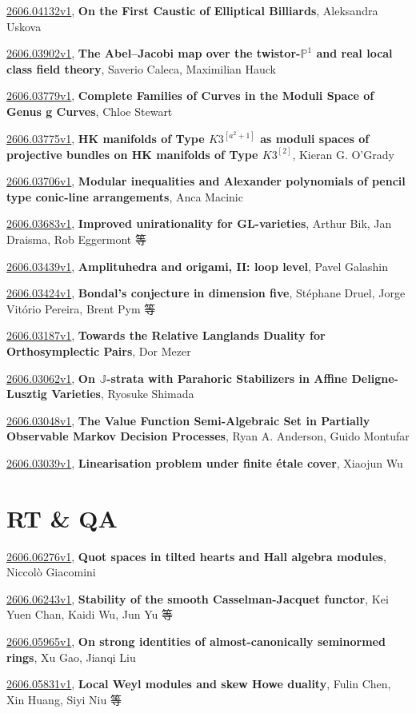 \documentclass[9pt, a4paper]{article}
\theoremstyle{plain}
\theoremstyle{definition}
\theoremstyle{remark}
\newcommand{\arxiv}[3]{\href{https://arxiv.org/abs/#1}{#1}, \textbf{\textcolor{arxivblue}{#2}}, #3}
\begin{document}
\arxiv{2606.04132v1}{On the First Caustic of Elliptical Billiards}{Aleksandra Uskova}

\arxiv{2606.03902v1}{The Abel--Jacobi map over the twistor-$\mathbb{P}^1$ and real local class field theory}{Saverio Caleca, Maximilian Hauck}

\arxiv{2606.03779v1}{Complete Families of Curves in the Moduli Space of Genus g Curves}{Chloe Stewart}

\arxiv{2606.03775v1}{HK manifolds of Type $K3^{[a^2+1]}$ as moduli spaces of projective bundles on HK manifolds of Type $K3^{[2]}$}{Kieran G. O'Grady}

\arxiv{2606.03706v1}{Modular inequalities and Alexander polynomials of pencil type conic-line arrangements}{Anca Macinic}

\arxiv{2606.03683v1}{Improved unirationality for GL-varieties}{Arthur Bik, Jan Draisma, Rob Eggermont 等}

\arxiv{2606.03439v1}{Amplituhedra and origami, II: loop level}{Pavel Galashin}

\arxiv{2606.03424v1}{Bondal's conjecture in dimension five}{Stéphane Druel, Jorge Vitório Pereira, Brent Pym 等}

\arxiv{2606.03187v1}{Towards the Relative Langlands Duality for Orthosymplectic Pairs}{Dor Mezer}

\arxiv{2606.03062v1}{On $\mathbb J$-strata with Parahoric Stabilizers in Affine Deligne-Lusztig Varieties}{Ryosuke Shimada}

\arxiv{2606.03048v1}{The Value Function Semi-Algebraic Set in Partially Observable Markov Decision Processes}{Ryan A. Anderson, Guido Montufar}

\arxiv{2606.03039v1}{Linearisation problem under finite étale cover}{Xiaojun Wu}


\section{RT \& QA}
\arxiv{2606.06276v1}{Quot spaces in tilted hearts and Hall algebra modules}{Niccolò Giacomini}

\arxiv{2606.06243v1}{Stability of the smooth Casselman-Jacquet functor}{Kei Yuen Chan, Kaidi Wu, Jun Yu 等}

\arxiv{2606.05965v1}{On strong identities of almost-canonically seminormed rings}{Xu Gao, Jianqi Liu}

\arxiv{2606.05831v1}{Local Weyl modules and skew Howe duality}{Fulin Chen, Xin Huang, Siyi Niu 等}
\end{document}
